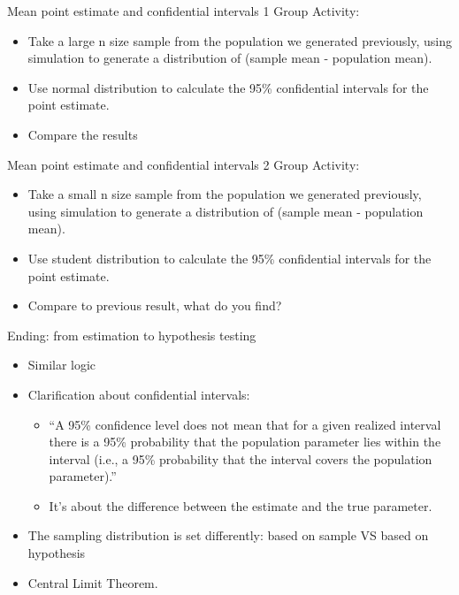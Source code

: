 \documentclass[
  ignorenonframetext,
]{beamer}
\providecommand{\tightlist}{%
  \setlength{\itemsep}{0pt}\setlength{\parskip}{0pt}}
\begin{document}
\begin{frame}{Mean point estimate and confidential intervals 1}
\protect\hypertarget{mean-point-estimate-and-confidential-intervals-1}{}
Group Activity:

\begin{itemize}
\tightlist
\item
  Take a large n size sample from the population we generated
  previously, using simulation to generate a distribution of (sample
  mean - population mean).
\item
  Use normal distribution to calculate the 95\% confidential intervals
  for the point estimate.
\item
  Compare the results
\end{itemize}
\end{frame}

\begin{frame}{Mean point estimate and confidential intervals 2}
\protect\hypertarget{mean-point-estimate-and-confidential-intervals-2}{}
Group Activity:

\begin{itemize}
\tightlist
\item
  Take a small n size sample from the population we generated
  previously, using simulation to generate a distribution of (sample
  mean - population mean).
\item
  Use student distribution to calculate the 95\% confidential intervals
  for the point estimate.
\item
  Compare to previous result, what do you find?
\end{itemize}
\end{frame}

\begin{frame}{Ending: from estimation to hypothesis testing}
\protect\hypertarget{ending-from-estimation-to-hypothesis-testing}{}
\begin{itemize}
\tightlist
\item
  Similar logic
\item
  Clarification about confidential intervals:

  \begin{itemize}
  \tightlist
  \item
    ``A 95\% confidence level does not mean that for a given realized
    interval there is a 95\% probability that the population parameter
    lies within the interval (i.e., a 95\% probability that the interval
    covers the population parameter).''
  \item
    It's about the difference between the estimate and the true
    parameter.
  \end{itemize}
\item
  The sampling distribution is set differently: based on sample VS based
  on hypothesis
\item
  Central Limit Theorem.
\end{itemize}
\end{frame}
\end{document}
